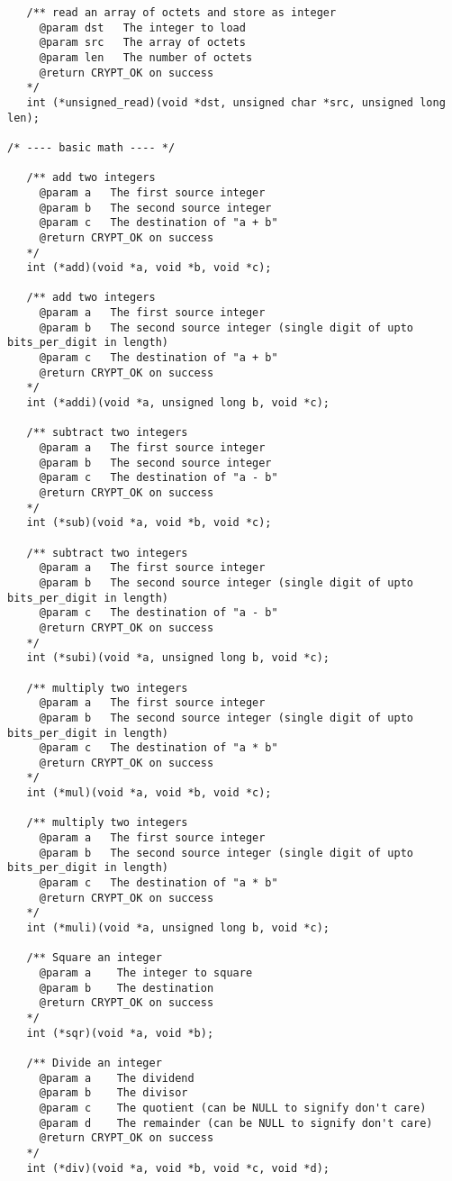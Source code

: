 \documentclass[a4paper]{book}
\begin{document}
\begin{small}
\begin{verbatim}
   /** read an array of octets and store as integer
     @param dst   The integer to load
     @param src   The array of octets 
     @param len   The number of octets 
     @return CRYPT_OK on success
   */
   int (*unsigned_read)(void *dst, unsigned char *src, unsigned long len);

/* ---- basic math ---- */

   /** add two integers 
     @param a   The first source integer
     @param b   The second source integer
     @param c   The destination of "a + b"
     @return CRYPT_OK on success
   */
   int (*add)(void *a, void *b, void *c);

   /** add two integers 
     @param a   The first source integer
     @param b   The second source integer (single digit of upto bits_per_digit in length)
     @param c   The destination of "a + b"
     @return CRYPT_OK on success
   */
   int (*addi)(void *a, unsigned long b, void *c);

   /** subtract two integers 
     @param a   The first source integer
     @param b   The second source integer
     @param c   The destination of "a - b"
     @return CRYPT_OK on success
   */
   int (*sub)(void *a, void *b, void *c);

   /** subtract two integers 
     @param a   The first source integer
     @param b   The second source integer (single digit of upto bits_per_digit in length)
     @param c   The destination of "a - b"
     @return CRYPT_OK on success
   */
   int (*subi)(void *a, unsigned long b, void *c);

   /** multiply two integers 
     @param a   The first source integer
     @param b   The second source integer (single digit of upto bits_per_digit in length)
     @param c   The destination of "a * b"
     @return CRYPT_OK on success
   */
   int (*mul)(void *a, void *b, void *c);

   /** multiply two integers 
     @param a   The first source integer
     @param b   The second source integer (single digit of upto bits_per_digit in length)
     @param c   The destination of "a * b"
     @return CRYPT_OK on success
   */
   int (*muli)(void *a, unsigned long b, void *c);

   /** Square an integer
     @param a    The integer to square
     @param b    The destination
     @return CRYPT_OK on success
   */
   int (*sqr)(void *a, void *b);

   /** Divide an integer
     @param a    The dividend
     @param b    The divisor
     @param c    The quotient (can be NULL to signify don't care)
     @param d    The remainder (can be NULL to signify don't care)
     @return CRYPT_OK on success
   */
   int (*div)(void *a, void *b, void *c, void *d);


\end{verbatim}
\end{small}
\end{document}
